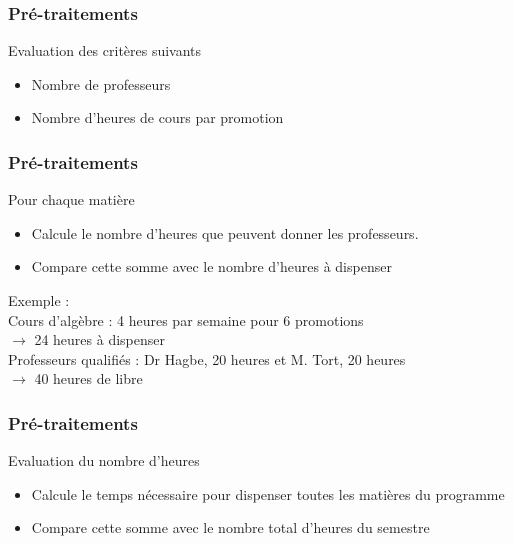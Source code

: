 \documentclass{beamer}
\begin{document}
\begin{frame}
\frametitle{Pré-traitements}
\begin{block}{Evaluation des critères suivants}
\begin {itemize}
\item Nombre de professeurs
\item Nombre d'heures de cours par promotion
\end{itemize}
\end{block}
\end{frame}

\begin{frame}
\frametitle{Pré-traitements}
\begin{block}{Pour chaque matière}
\begin{itemize}
\item Calcule le nombre d'heures que peuvent donner les professeurs.
\item Compare cette somme avec le nombre d'heures à dispenser
\end{itemize}
\end{block}
\vspace{\baselineskip}Exemple : \\
Cours d'algèbre : 4 heures par semaine pour 6 promotions\\ 
$\rightarrow$ 24 heures à dispenser\\
Professeurs qualifiés : Dr Hagbe, 20 heures et M. Tort, 20 heures\\
$\rightarrow$ 40 heures de libre\\
\end{frame}

\begin{frame}
\frametitle{Pré-traitements}
\begin{block}{Evaluation du nombre d'heures}
\begin{itemize}
\item Calcule le temps nécessaire pour dispenser toutes les matières du programme
\item Compare cette somme avec le nombre total d'heures du semestre
\end{itemize}
\end{block}
\end{frame}
\end{document}
